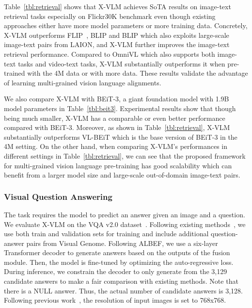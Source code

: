 \documentclass{article}
\newcommand{\baby}{X-VLM\xspace}
\newcommand{\babyB}{X-VLM\xspace}
\newcommand{\babyL}{X-VLM\xspace}
\begin{document}
Table~\ref{tbl:retrieval} shows that \baby achieves SoTA results on image-text retrieval tasks especially on Flickr30K benchmark even though existing approaches either have more model parameters or more training data. Concretely, \babyB outperforms FLIP~\cite{yao2021filip}, BLIP and BLIP which also exploits large-scale image-text pairs from LAION, and \babyL further improves the image-text retrieval performance. Compared to OmniVL which also supports both image-text tasks and video-text tasks, \babyB substantially outperforms it when pre-trained with the 4M data or with more data. These results validate the advantage of learning multi-grained vision language alignments. 




We also compare \babyL with BEiT-3, a giant foundation model with 1.9B model parameters in Table~\ref{tbl:beit3}. Experimental results show that though being much smaller, \babyL has a comparable or even better performance compared with BEiT-3. Moreover, as shown in Table~\ref{tbl:retrieval}, \babyB substantially outperforms VL-BEiT which is the base version of BEiT-3 in the 4M setting. On the other hand, when comparing \baby's performances in different settings in Table~\ref{tbl:retrieval}, we can see that the proposed framework for multi-grained vision language pre-training has good scalability which can benefit from a larger model size and large-scale out-of-domain image-text pairs. 



\subsubsection{Visual Question Answering}
The task requires the model to predict an answer given an image and a question. We evaluate \baby on the VQA v2.0 dataset~\cite{goyal2017making}. Following existing methods~\cite{tan2019lxmert, chen2020uniter, li2021align}, we use both train and validation sets for training and include additional question-answer pairs from Visual Genome. Following ALBEF, we use a six-layer Transformer decoder to generate answers based on the outputs of the fusion module. Then, the model is fine-tuned by optimizing the auto-regressive loss. During inference, we constrain the decoder to only generate from the 3,129 candidate answers to make a fair comparison with existing methods. Note that there is a NULL answer. Thus, the actual number of candidate answers is 3,128. Following previous work~\cite{wang2022ofa,yu2022coca,wang2022image}, the resolution of input images is set to 768x768.
\end{document}
